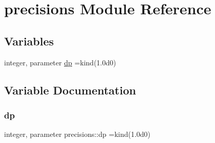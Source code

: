 \hypertarget{namespaceprecisions}{}\section{precisions Module Reference}
\label{namespaceprecisions}
\subsection*{Variables}
\begin{DoxyCompactItemize}
\item 
integer, parameter \mbox{\hyperlink{namespaceprecisions_a70c0046430d95734ae5df77254ce2897}{dp}} =kind(1.\+0d0)
\end{DoxyCompactItemize}


\subsection{Variable Documentation}
\mbox{\label{namespaceprecisions_a70c0046430d95734ae5df77254ce2897}} 
\subsubsection{\texorpdfstring{dp}{dp}}
{\footnotesize\ttfamily integer, parameter precisions\+::dp =kind(1.\+0d0)}

